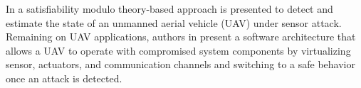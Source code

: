 \documentclass[letterpaper, 10 pt, conference]{ieeeconf}  %
\newcommand\NB[1]{$\spadesuit$\footnote{NB: #1}}
\begin{document}
In \cite{shoukry2015secure} a satisfiability modulo theory-based approach is presented to detect and estimate the state of an unmanned aerial vehicle (UAV) under sensor attack. Remaining on UAV applications, authors in \cite{yoon2017virtualdrone} present a software architecture that allows a UAV to operate with compromised system components by virtualizing sensor, actuators, and communication channels and switching to a safe behavior once an attack is detected. 

\end{document}
